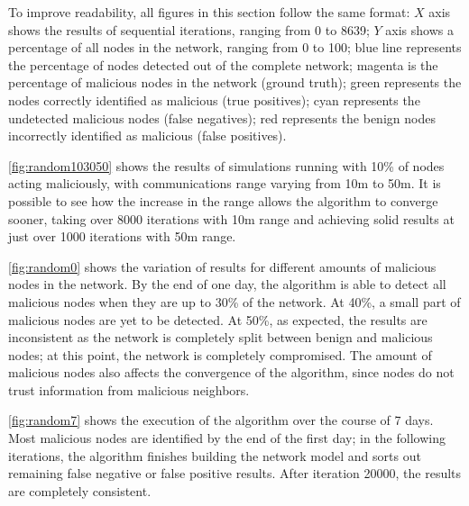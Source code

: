 To improve readability, all figures in this section follow the same format:
$X$ axis shows the results of sequential iterations, ranging from 0 to 8639;
$Y$ axis shows a percentage of all nodes in the network, ranging from 0 to 100;
blue line represents the percentage of nodes detected out of the complete network;
magenta is the percentage of malicious nodes in the network (ground truth);
green represents the nodes correctly identified as malicious (true positives);
cyan represents the undetected malicious nodes (false negatives); 
red represents the benign nodes incorrectly identified as malicious (false positives).

\autoref{fig:random103050} shows the results of simulations running with 10\% of nodes acting maliciously, with communications range varying from 10m to 50m.
It is possible to see how the increase in the range allows the algorithm to converge sooner, taking over 8000 iterations with 10m range and achieving solid results at just over 1000 iterations with 50m range. 

\autoref{fig:random0} shows the variation of results for different amounts of malicious nodes in the network.
By the end of one day, the algorithm is able to detect all malicious nodes when they are up to 30\% of the network.
At 40\%, a small part of malicious nodes are yet to be detected.
At 50\%, as expected, the results are inconsistent as the network is completely split between benign and malicious nodes; at this point, the network is completely compromised.
The amount of malicious nodes also affects the convergence of the algorithm, since nodes do not trust information from malicious neighbors.

\autoref{fig:random7} shows the execution of the algorithm over the course of 7 days.
Most malicious nodes are identified by the end of the first day; in the following iterations, the algorithm finishes building the network model and sorts out remaining false negative or false positive results.
After iteration 20000, the results are completely consistent.

